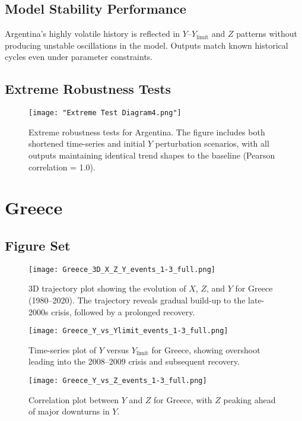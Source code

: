 \documentclass[12pt,a4paper]{article}
\begin{document}
\subsection{Model Stability Performance}
Argentina’s highly volatile history is reflected in $Y$–$Y_{\text{limit}}$ and $Z$ patterns without producing unstable oscillations in the model. Outputs match known historical cycles even under parameter constraints.

\subsection{Extreme Robustness Tests}

\begin{figure}[h]
    \centering
    \texttt{[image: "Extreme Test Diagram4.png"]}
    \caption{Extreme robustness tests for Argentina. The figure includes both shortened time-series and initial $Y$ perturbation scenarios, with all outputs maintaining identical trend shapes to the baseline (Pearson correlation = 1.0).}
    \label{fig:argentina_extreme}
\end{figure}

\section{Greece}
\subsection{Figure Set}

\begin{figure}[H]
    \centering
    \texttt{[image: Greece\_3D\_X\_Z\_Y\_events\_1-3\_full.png]}
    \caption{3D trajectory plot showing the evolution of $X$, $Z$, and $Y$ for Greece (1980--2020). The trajectory reveals gradual build-up to the late-2000s crisis, followed by a prolonged recovery.}
    \label{fig:greece_3d_x_z_y}
\end{figure}

\begin{figure}[H]
    \centering
    \texttt{[image: Greece\_Y\_vs\_Ylimit\_events\_1-3\_full.png]}
    \caption{Time-series plot of $Y$ versus $Y_{\text{limit}}$ for Greece, showing overshoot leading into the 2008–2009 crisis and subsequent recovery.}
    \label{fig:greece_y_vs_ylimit}
\end{figure}

\begin{figure}[H]
    \centering
    \texttt{[image: Greece\_Y\_vs\_Z\_events\_1-3\_full.png]}
    \caption{Correlation plot between $Y$ and $Z$ for Greece, with $Z$ peaking ahead of major downturns in $Y$.}
    \label{fig:greece_y_vs_z}
\end{figure}
\end{document}

